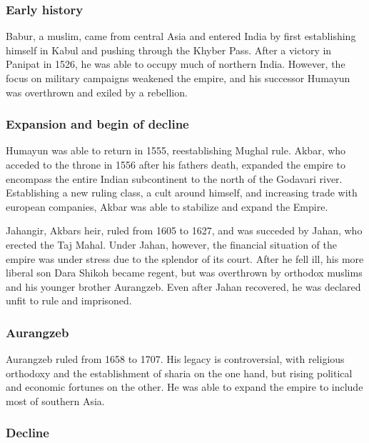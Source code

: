 \documentclass[11pt, a4paper, headings=standardclasses]{scrartcl}
\begin{document}
\subsubsection{Early history}

Babur, a muslim, came from central Asia and entered India by first establishing himself in Kabul and pushing through the Khyber Pass.
 After a victory in Panipat in 1526, he was able to occupy much of northern India. However, the focus on military campaigns weakened the empire, and his successor Humayun was overthrown and exiled by a rebellion.\autocite[Chapter 1]{richards}

\subsubsection{Expansion and begin of decline}

Humayun was able to return in 1555, reestablishing Mughal rule.\autocite[12]{richards} Akbar, who acceded to the throne in 1556 after his fathers death, expanded the empire to encompass the entire Indian subcontinent to the north of the Godavari river. Establishing a new ruling class, a cult around himself, and increasing trade with european companies, Akbar was able to stabilize and expand the Empire.\autocite[16]{richards}

Jahangir, Akbars heir, ruled from 1605 to 1627, and was succeded by Jahan, who erected the Taj Mahal. Under Jahan, however, the financial situation of the empire was under stress due to the splendor of its court.\autocite[Chapter 6]{richards} After he fell ill, his more liberal son Dara Shikoh became regent, but was overthrown by orthodox muslims and his younger brother Aurangzeb. Even after Jahan recovered, he was declared unfit to rule and imprisoned.\autocite[Chapter 7]{richards}

\subsubsection{Aurangzeb}

Aurangzeb ruled from 1658 to 1707\autocite[165]{richards}. His legacy is controversial, with religious orthodoxy and the establishment of sharia on the one hand, but rising political and economic fortunes on the other. He was able to expand the empire to include most of southern Asia.\autocite[Chapter 8]{richards}

\subsubsection{Decline}
\end{document}
